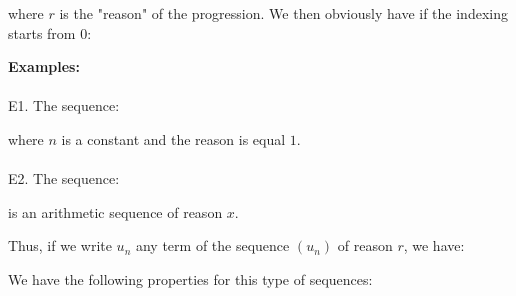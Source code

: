 where $r$ is the "reason" of the progression. We then obviously have if the indexing starts from $0$:
	
	\begin{tcolorbox}[colframe=black,colback=white,sharp corners]
\textbf{{\Large {}}Examples:}\\\\
E1. The sequence:
	
where $n$ is a constant and the reason is equal $1$.\\\\
E2. The sequence:
	
is an arithmetic sequence of reason $x$.
	\end{tcolorbox}
Thus, if we write $u_n$ any term of the sequence $(u_n)$ of reason $r$, we have:
	
We have the following properties for this type of sequences:
